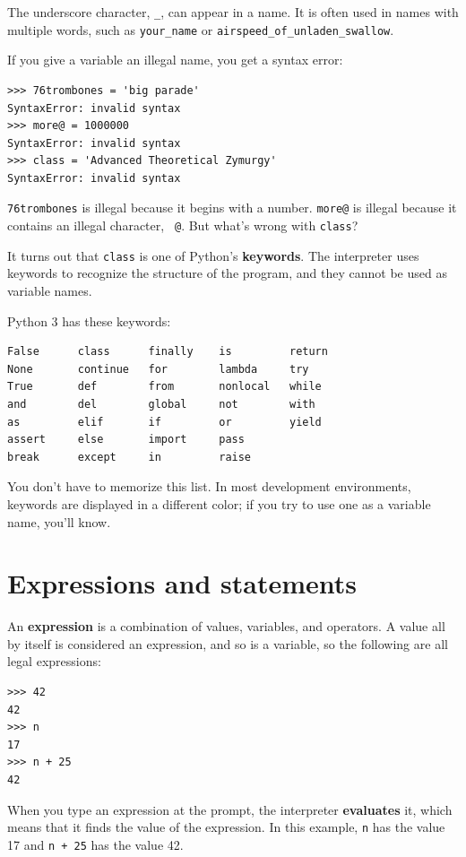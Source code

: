 \documentclass[10pt]{book}
\begin{document}
The underscore character, \verb"_", can appear in a name.
It is often used in names with multiple words, such as
\verb"your_name" or \verb"airspeed_of_unladen_swallow".

If you give a variable an illegal name, you get a syntax error:

\begin{verbatim}
>>> 76trombones = 'big parade'
SyntaxError: invalid syntax
>>> more@ = 1000000
SyntaxError: invalid syntax
>>> class = 'Advanced Theoretical Zymurgy'
SyntaxError: invalid syntax
\end{verbatim}
%
{\tt 76trombones} is illegal because it begins with a number.
{\tt more@} is illegal because it contains an illegal character, {\tt
@}.  But what's wrong with {\tt class}?

It turns out that {\tt class} is one of Python's {\bf keywords}.  The
interpreter uses keywords to recognize the structure of the program,
and they cannot be used as variable names.

Python 3 has these keywords:

\begin{verbatim}
False      class      finally    is         return
None       continue   for        lambda     try
True       def        from       nonlocal   while
and        del        global     not        with
as         elif       if         or         yield
assert     else       import     pass
break      except     in         raise
\end{verbatim}
%
You don't have to memorize this list.  In most development environments,
keywords are displayed in a different color; if you try to use one
as a variable name, you'll know.


\section{Expressions and statements}

An {\bf expression} is a combination of values, variables, and operators.
A value all by itself is considered an expression, and so is
a variable, so the following are all legal expressions:

\begin{verbatim}
>>> 42
42
>>> n
17
>>> n + 25
42
\end{verbatim}
%
When you type an expression at the prompt, the interpreter
{\bf evaluates} it, which means that it finds the value of
the expression.
In this example, {\tt n} has the value 17 and
{\tt n + 25} has the value 42.
\end{document}
